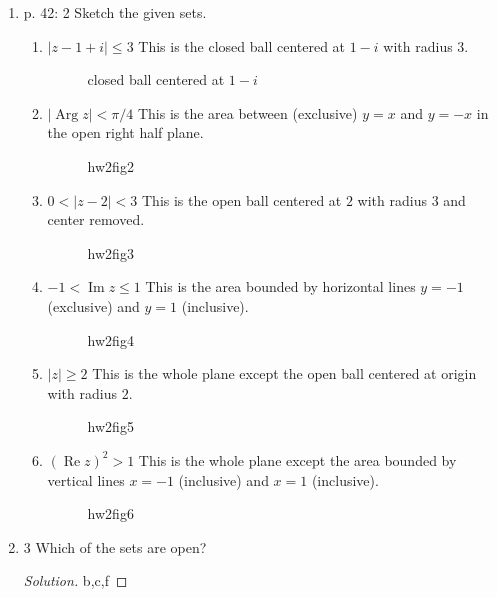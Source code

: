 \begin{enumerate}
\item p. 42: 2 Sketch the given sets. 
	\begin{enumerate}
		\item  $|z-1+i| \leq 3$
			This is the closed ball centered at $1-i$ with radius $3$. 
\begin{figure}[H]
    \centering
    \caption{closed ball centered at $1-i$}
    \label{fig:closed-ball-centered-at-with-radius}
\end{figure}
		\item  $|\operatorname{Arg} z|<\pi / 4$
			This is the area between (exclusive) $y=x$ and $y=-x$ in the open right half plane.
\begin{figure}[H]
    \centering
    \caption{hw2fig2}
    \label{fig:hw2fig2}
\end{figure}
		\item  $0<|z-2|<3$
			This is the open ball centered at $2$ with radius $3$ and center removed.
\begin{figure}[H]
    \centering
    \caption{hw2fig3}
    \label{fig:hw2fig3}
\end{figure}
		\item  $-1<\operatorname{Im} z \leq 1$
			This is the area bounded by horizontal lines $y=-1$ (exclusive) and $y=1$ (inclusive).
\begin{figure}[H]
    \centering
    \caption{hw2fig4}
    \label{fig:hw2fig4}
\end{figure}
		\item  $|z| \geq 2$
			This is the whole plane except the open ball centered at origin with radius $2$.
\begin{figure}[ht]
    \centering
    \caption{hw2fig5}
    \label{fig:hw2fig5}
\end{figure}
		\item  $(\operatorname{Re} z)^2>1$
			This is the whole plane except the area bounded by vertical lines $x=-1 $ (inclusive) and $x=1$ (inclusive).
\begin{figure}[H]
    \centering
    \caption{hw2fig6}
    \label{fig:hw2fig6}
\end{figure}
	\end{enumerate}

\item 3 Which of the sets are open?
\begin{proof}[Solution]
	b,c,f
\end{proof}


\end{enumerate}
